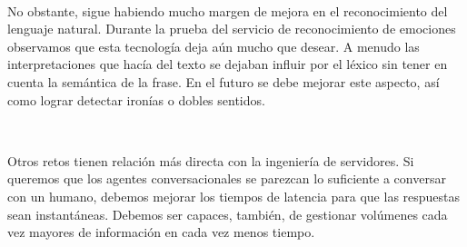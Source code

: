 \documentclass[paper=a4, fontsize=10pt]{scrartcl} %
\numberwithin{equation}{section} %
\numberwithin{figure}{section} %
\numberwithin{table}{section} %
\begin{document}
\

No obstante, sigue habiendo mucho margen de mejora en el reconocimiento del lenguaje natural. Durante la prueba del servicio de reconocimiento de emociones observamos que esta tecnología deja aún mucho que desear. A menudo las interpretaciones que hacía del texto se dejaban influir por el léxico sin tener en cuenta la semántica de la frase. En el futuro se debe mejorar este aspecto, así como lograr detectar ironías o dobles sentidos.

\

Otros retos tienen relación más directa con la ingeniería de servidores. Si queremos que los agentes conversacionales se parezcan lo suficiente a conversar con un humano, debemos mejorar los tiempos de latencia para que las respuestas sean instantáneas. Debemos ser capaces, también, de gestionar volúmenes cada vez mayores de información en cada vez menos tiempo.

\newpage
\end{document}
